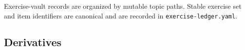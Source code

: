 
Exercise-vault records are organized by mutable topic paths. Stable exercise
set and item identifiers are canonical and are recorded in
\texttt{exercise-ledger.yaml}.

\subsection*{Derivatives}


